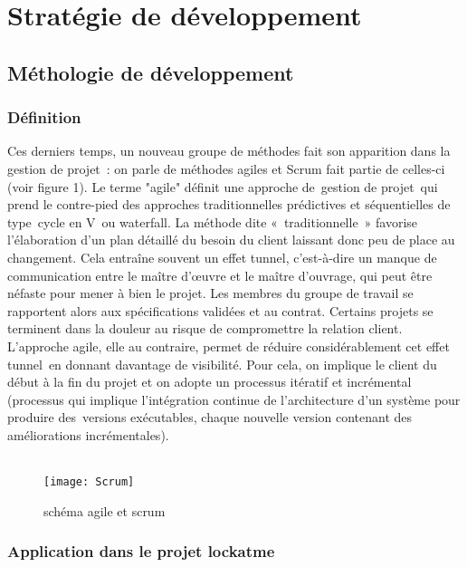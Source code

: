 \chapter{Stratégie de développement}
\section{Méthologie de développement}
\subsection{Définition}

Ces derniers temps, un nouveau groupe de méthodes fait son apparition dans la
gestion de projet : on parle de méthodes agiles et Scrum fait partie de
celles-ci (voir figure 1). Le terme "agile" définit une approche de gestion de projet qui prend
le contre-pied des approches traditionnelles prédictives et séquentielles de
type cycle en V ou waterfall.
La méthode dite « traditionnelle » favorise l’élaboration d’un plan détaillé
du besoin du client laissant donc peu de place au changement. Cela entraîne
souvent un effet tunnel, c’est-à-dire un manque de communication entre le
maître d’œuvre et le maître d’ouvrage, qui peut être néfaste pour mener à bien
le projet. Les membres du groupe de travail se rapportent alors aux
spécifications validées et au contrat. Certains projets se terminent dans la
douleur au risque de compromettre la relation client.
L’approche agile, elle au contraire, permet de réduire considérablement cet
effet tunnel en donnant davantage de visibilité. Pour cela, on implique le
client du début à la fin du projet et on adopte un processus itératif et
incrémental (processus qui implique l'intégration continue de l'architecture
d'un système pour produire des versions exécutables, chaque nouvelle version
contenant des améliorations incrémentales).
\\
\\

\begin{figure}[h]
  \texttt{[image: Scrum]}
  \caption{schéma agile et scrum}
\end{figure}

\subsection{Application dans le projet lockatme}

